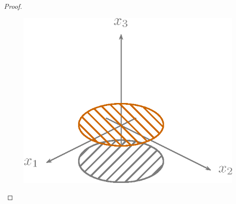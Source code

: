 \documentclass[a4paper,10pt]{scrbook}
\begin{document}
\begin{theorem}
\begin{proof}
\begin{figure}[H]
      \centering
      \includegraphics[scale=0.2]{images/ana3-tmp-64}
    \end{figure}
  \end{proof}
\end{theorem}
\end{document}
